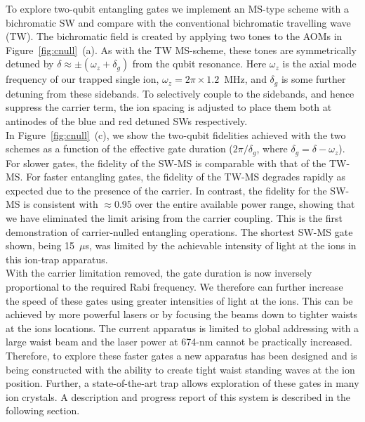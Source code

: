 \documentclass[12pt]{iopart}
\begin{document}
    To explore two-qubit entangling gates we implement an MS-type
    scheme with a bichromatic SW and compare with the conventional
    bichromatic travelling wave (TW). The bichromatic field is created
    by applying two tones to the AOMs in
    Figure~\ref{fig:cnull}~(a). As with the TW MS-scheme, these
    tones are symmetrically detuned by $\delta \approx \pm(\omega_z + \delta_g) $ from the
    qubit resonance. Here $\omega_z$ is the axial mode frequency of
    our trapped single ion, $\omega_z = 2\pi\times 1.2$~MHz, and
    $\delta_g$ is some further detuning from these sidebands. To
    selectively couple to the sidebands, and hence suppress the
    carrier term, the ion spacing is adjusted to place them both at
    antinodes of the blue and red detuned SWs respectively.\\
    In Figure~\ref{fig:cnull}~(c), we show the two-qubit fidelities
    achieved with the two schemes as a function of the effective gate
    duration ($2\pi/\delta_g$, where
    $\delta_g = \delta - \omega_z$). For slower gates, the fidelity of
    the SW-MS is comparable with that of the TW-MS. For faster
    entangling gates, the fidelity of the TW-MS degrades rapidly as
    expected due to the presence of the carrier. In contrast, the fidelity
    for the SW-MS is consistent with $\approx 0.95$ over the entire
    available power range, showing that we have eliminated the limit
    arising from the carrier coupling. This is the first demonstration of carrier-nulled entangling operations. The shortest SW-MS gate shown, being 15~$\mu$s, was limited by the achievable intensity of light at the ions in
    this ion-trap apparatus. 
    \\ With the carrier limitation removed, the gate duration is now
    inversely proportional to the required Rabi frequency. We
    therefore can further increase the speed of these gates using
    greater intensities of light at the ions. This can be achieved by
    more powerful lasers or by focusing the beams down to tighter
    waists at the ions locations. The current apparatus is limited to
    global addressing with a large waist beam and the laser power at
    674-nm cannot be practically increased. Therefore, to explore
    these faster gates a new apparatus has been designed and is being
    constructed with the ability to create tight waist standing waves
    at the ion position. Further, a state-of-the-art trap allows
    exploration of these gates in many ion crystals. A description and
    progress report of this system is described in the following
    section.\\
\end{document}
